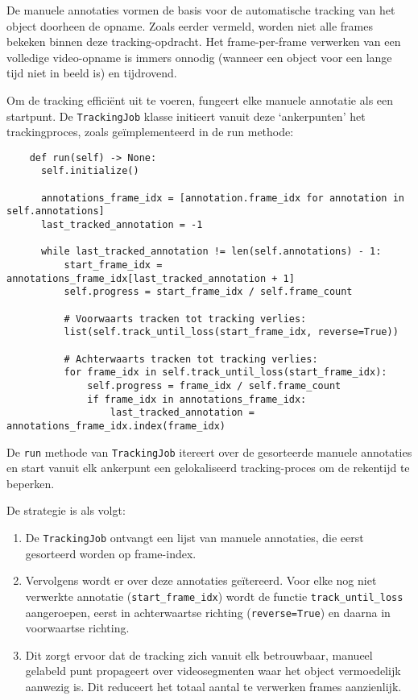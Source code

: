 De manuele annotaties vormen de basis voor de automatische tracking van het object doorheen de opname.
Zoals eerder vermeld, worden niet alle frames bekeken binnen deze tracking-opdracht.
Het frame-per-frame verwerken van een volledige video-opname is immers onnodig (wanneer een object voor een lange tijd niet in beeld is) en tijdrovend.

Om de tracking efficiënt uit te voeren, fungeert elke manuele annotatie als een startpunt. 
De \texttt{TrackingJob} klasse initieert vanuit deze `ankerpunten' het trackingproces, zoals geïmplementeerd in de run methode:

\begin{listing}[H]
  \begin{verbatim}
    def run(self) -> None:
      self.initialize()

      annotations_frame_idx = [annotation.frame_idx for annotation in self.annotations]
      last_tracked_annotation = -1

      while last_tracked_annotation != len(self.annotations) - 1:
          start_frame_idx = annotations_frame_idx[last_tracked_annotation + 1]
          self.progress = start_frame_idx / self.frame_count

          # Voorwaarts tracken tot tracking verlies:
          list(self.track_until_loss(start_frame_idx, reverse=True))

          # Achterwaarts tracken tot tracking verlies:
          for frame_idx in self.track_until_loss(start_frame_idx):
              self.progress = frame_idx / self.frame_count
              if frame_idx in annotations_frame_idx:
                  last_tracked_annotation = annotations_frame_idx.index(frame_idx)
  \end{verbatim}
  \caption[Kernlogica van de \texttt{TrackingJob} voor efficiënte verwerking]{
    De \texttt{run} methode van \texttt{TrackingJob} itereert over de gesorteerde manuele annotaties en start vanuit elk ankerpunt een 
    gelokaliseerd tracking-proces om de rekentijd te beperken.
  }
\end{listing}

De strategie is als volgt:
\begin{enumerate}
\item De \texttt{TrackingJob} ontvangt een lijst van manuele annotaties, die eerst gesorteerd worden op frame-index.
\item Vervolgens wordt er over deze annotaties geïtereerd. Voor elke nog niet verwerkte annotatie (\texttt{start\_frame\_idx}) 
wordt de functie \texttt{track\_until\_loss} aangeroepen, eerst in achterwaartse richting (\texttt{reverse=True}) en daarna in voorwaartse richting.
\item Dit zorgt ervoor dat de tracking zich vanuit elk betrouwbaar, manueel gelabeld punt propageert over videosegmenten waar het object vermoedelijk aanwezig is. 
Dit reduceert het totaal aantal te verwerken frames aanzienlijk.
\end{enumerate}

